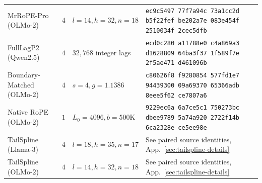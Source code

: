 \begin{table}[ht]
{\begin{tabular}{@{}p{.28\linewidth}p{.12\linewidth}p{.22\linewidth}p{.38\linewidth}@{}}
MrRoPE-Pro (OLMo-2)  & $4$ & $l{=}14, h{=}32, n{=}18$ & {\scriptsize\texttt{ec9c5497 77f7a94c 73a1cc2d b5f22fef be202a7e 083e454f 2510034f 2cec5dfb}} \\
FullLagP2 (Qwen2.5)  & $4$ & $32{,}768$ integer lags  & {\scriptsize\texttt{ecd0c280 a11788e0 c4a869a3 d1628809 64ba3f37 1f589f7e 2f5ae471 d461096b}} \\
Boundary-Matched (OLMo-2) & $4$ & $s{=}4, g{=}1.1386$ & {\scriptsize\texttt{c80626f8 f9280854 577fd1e7 94439300 09a69370 65366adb 8eee5f62 ce7807a6}} \\
Native RoPE (OLMo-2) & $1$ & $L_0{=}4096, b{=}500\text{K}$ & {\scriptsize\texttt{9229ec6a 6a7ce5c1 750273bc dbee9789 5a74a920 2722f14b 6ca2328e ce5ee98e}} \\
TailSpline (Llama-$3$) & $4$ & $l=18,h=35,n=17$ & See paired source identities, App.~\ref{sec:tailspline-details} \\
TailSpline (OLMo-$2$) & $4$ & $l=14,h=32,n=18$ & See paired source identities, App.~\ref{sec:tailspline-details} \\
\bottomrule
\end{tabular}%
}
\end{table}

